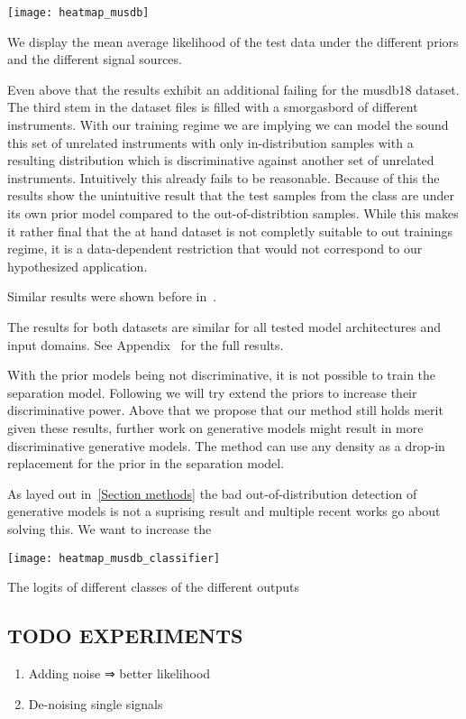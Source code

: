 \begin{marginfigure}
    \texttt{[image: heatmap\_musdb]}%
    \caption{We display the mean average likelihood of the test data under the different priors and the different signal sources.}%
    \label{fig:heatmap_musdb}
\end{marginfigure}

Even above that the results exhibit an additional failing for the musdb18 dataset. The third stem in the dataset files  is filled with a smorgasbord of different instruments. With our training regime we are implying we can model the sound this set of unrelated instruments with only in-distribution samples with a resulting distribution which is discriminative against another set of unrelated instruments. Intuitively this already fails to be reasonable. Because of this the results show the unintuitive result that the test samples from the  class are  under its own prior model compared to the out-of-distribtion samples. While this makes it rather final that the at hand dataset is not completly suitable to out trainings regime, it is a data-dependent restriction that would not correspond to our hypothesized application.

Similar results were shown before in~.

The results for both datasets are similar for all tested model architectures and input domains. See Appendix~ for the full results.

With the prior models being not discriminative, it is not possible to train the separation model. Following we will try extend the priors to increase their discriminative power. Above that we propose that our method still holds merit given these results, further work on generative models might result in more discriminative generative models. The method can use any density as a drop-in replacement for the prior in the separation model.

As layed out in~\ref{Section methods} the bad out-of-distribution detection of generative models is not a suprising result and multiple recent works go about solving this. We want to increase the

\begin{marginfigure}
    \texttt{[image: heatmap\_musdb\_classifier]}
    \caption{The logits of different classes of the different outputs}%
    \label{fig:heatmap_musdb_classifier}
\end{marginfigure}


\subsection{TODO EXPERIMENTS}
\begin{enumerate}
    \item Adding noise ⇒ better likelihood
    \item De-noising single signals
\end{enumerate}
